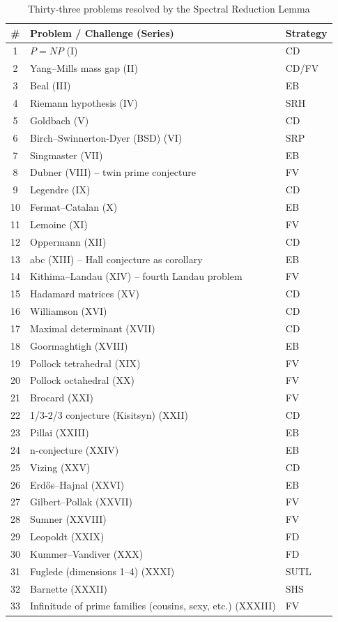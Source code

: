 \documentclass[11pt,a4paper]{article}
\begin{document}
\begin{center}
\small
\begin{longtable}{@{}cll@{}}
\caption{Thirty‑three problems resolved by the Spectral Reduction Lemma}\\
\toprule
\# & Problem / Challenge (Series) & Strategy \\
\midrule
1 & \(P = NP\) (I) & CD \\
2 & Yang–Mills mass gap (II) & CD/FV \\
3 & Beal (III) & EB \\
4 & Riemann hypothesis (IV) & SRH \\
5 & Goldbach (V) & CD \\
6 & Birch–Swinnerton-Dyer (BSD) (VI) & SRP \\
7 & Singmaster (VII) & EB \\
8 & Dubner (VIII) – twin prime conjecture & FV \\
9 & Legendre (IX) & CD \\
10 & Fermat–Catalan (X) & EB \\
11 & Lemoine (XI) & FV \\
12 & Oppermann (XII) & CD \\
13 & abc (XIII) – Hall conjecture as corollary & EB \\
14 & Kithima–Landau (XIV) – fourth Landau problem & FV \\
15 & Hadamard matrices (XV) & CD \\
16 & Williamson (XVI) & CD \\
17 & Maximal determinant (XVII) & CD \\
18 & Goormaghtigh (XVIII) & EB \\
19 & Pollock tetrahedral (XIX) & FV \\
20 & Pollock octahedral (XX) & FV \\
21 & Brocard (XXI) & FV \\
22 & 1/3‑2/3 conjecture (Kisitsyn) (XXII) & CD \\
23 & Pillai (XXIII) & EB \\
24 & n‑conjecture (XXIV) & EB \\
25 & Vizing (XXV) & CD \\
26 & Erdős–Hajnal (XXVI) & EB \\
27 & Gilbert–Pollak (XXVII) & FV \\
28 & Sumner (XXVIII) & FV \\
29 & Leopoldt (XXIX) & FD \\
30 & Kummer–Vandiver (XXX) & FD \\
31 & Fuglede (dimensions 1–4) (XXXI) & SUTL \\
32 & Barnette (XXXII) & SHS \\
33 & Infinitude of prime families (cousins, sexy, etc.) (XXXIII) & FV \\
\bottomrule
\end{longtable}
\end{center}
\end{document}

